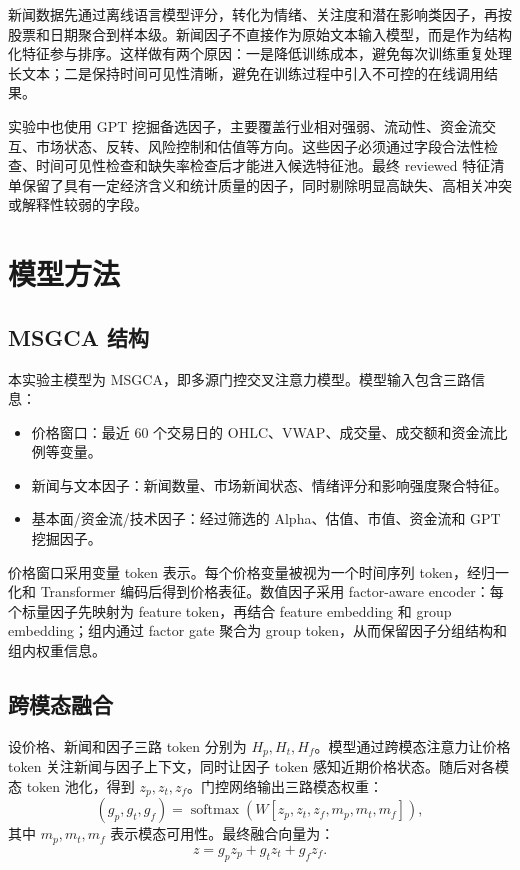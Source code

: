 \documentclass[UTF8,a4paper,12pt,fontset=none]{ctexart}
\begin{document}
新闻数据先通过离线语言模型评分，转化为情绪、关注度和潜在影响类因子，再按股票和日期聚合到样本级。新闻因子不直接作为原始文本输入模型，而是作为结构化特征参与排序。这样做有两个原因：一是降低训练成本，避免每次训练重复处理长文本；二是保持时间可见性清晰，避免在训练过程中引入不可控的在线调用结果。

实验中也使用 GPT 挖掘备选因子，主要覆盖行业相对强弱、流动性、资金流交互、市场状态、反转、风险控制和估值等方向。这些因子必须通过字段合法性检查、时间可见性检查和缺失率检查后才能进入候选特征池。最终 reviewed 特征清单保留了具有一定经济含义和统计质量的因子，同时剔除明显高缺失、高相关冲突或解释性较弱的字段。

\section{模型方法}

\subsection{MSGCA 结构}

本实验主模型为 MSGCA，即多源门控交叉注意力模型。模型输入包含三路信息：

\begin{itemize}
  \item 价格窗口：最近 60 个交易日的 OHLC、VWAP、成交量、成交额和资金流比例等变量。
  \item 新闻与文本因子：新闻数量、市场新闻状态、情绪评分和影响强度聚合特征。
  \item 基本面/资金流/技术因子：经过筛选的 Alpha、估值、市值、资金流和 GPT 挖掘因子。
\end{itemize}

价格窗口采用变量 token 表示。每个价格变量被视为一个时间序列 token，经归一化和 Transformer 编码后得到价格表征。数值因子采用 factor-aware encoder：每个标量因子先映射为 feature token，再结合 feature embedding 和 group embedding；组内通过 factor gate 聚合为 group token，从而保留因子分组结构和组内权重信息。

\subsection{跨模态融合}

设价格、新闻和因子三路 token 分别为 $H_p,H_t,H_f$。模型通过跨模态注意力让价格 token 关注新闻与因子上下文，同时让因子 token 感知近期价格状态。随后对各模态 token 池化，得到 $z_p,z_t,z_f$。门控网络输出三路模态权重：
\[
  (g_p,g_t,g_f)=\operatorname{softmax}(W[z_p,z_t,z_f,m_p,m_t,m_f]),
\]
其中 $m_p,m_t,m_f$ 表示模态可用性。最终融合向量为：
\[
  z=g_pz_p+g_tz_t+g_fz_f.
\]
\end{document}
